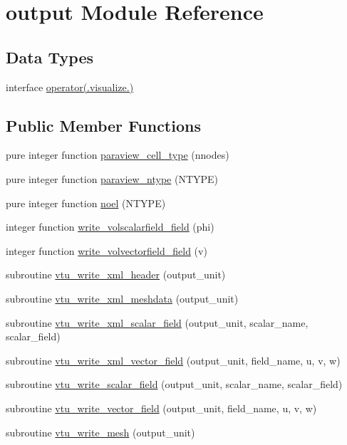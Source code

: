 \hypertarget{classoutput}{\section{output Module Reference}
\label{classoutput}
}
\subsection*{Data Types}
\begin{DoxyCompactItemize}
\item 
interface \hyperlink{interfaceoutput_1_1operator_07_8visualize_8_08}{operator(.\-visualize.)}
\end{DoxyCompactItemize}
\subsection*{Public Member Functions}
\begin{DoxyCompactItemize}
\item 
pure integer function \hyperlink{classoutput_a13f0dd663184eb8a7d5e6bedca6b1ae9}{paraview\-\_\-cell\-\_\-type} (nnodes)
\item 
pure integer function \hyperlink{classoutput_a0e9d894fc8d5b970498dbc38da4b5e8b}{paraview\-\_\-ntype} (N\-T\-Y\-P\-E)
\item 
pure integer function \hyperlink{classoutput_a7056173ffdf011c0acd43d0872ac6479}{noel} (N\-T\-Y\-P\-E)
\item 
integer function \hyperlink{classoutput_aec0a5b59f3bf4735afb3ccc21170f80d}{write\-\_\-volscalarfield\-\_\-field} (phi)
\item 
integer function \hyperlink{classoutput_a55cacab6d44b5e4d15636bd5c42bead2}{write\-\_\-volvectorfield\-\_\-field} (v)
\item 
subroutine \hyperlink{classoutput_ae0737d0d848c897c0bb7556a3a3dd866}{vtu\-\_\-write\-\_\-xml\-\_\-header} (output\-\_\-unit)
\item 
subroutine \hyperlink{classoutput_a24246576b3ee212f23b6c17c56c542ff}{vtu\-\_\-write\-\_\-xml\-\_\-meshdata} (output\-\_\-unit)
\item 
subroutine \hyperlink{classoutput_a7bb5b7be92f1202f519acc1c8b977bc1}{vtu\-\_\-write\-\_\-xml\-\_\-scalar\-\_\-field} (output\-\_\-unit, scalar\-\_\-name, scalar\-\_\-field)
\item 
subroutine \hyperlink{classoutput_af8b277fac5da59aef986ff54465695a7}{vtu\-\_\-write\-\_\-xml\-\_\-vector\-\_\-field} (output\-\_\-unit, field\-\_\-name, u, v, w)
\item 
subroutine \hyperlink{classoutput_a4f35a534b7fc56c340357b9efe60be9b}{vtu\-\_\-write\-\_\-scalar\-\_\-field} (output\-\_\-unit, scalar\-\_\-name, scalar\-\_\-field)
\item 
subroutine \hyperlink{classoutput_a6e8bb7cb030bfa7246ec346905b1eea6}{vtu\-\_\-write\-\_\-vector\-\_\-field} (output\-\_\-unit, field\-\_\-name, u, v, w)
\item 
subroutine \hyperlink{classoutput_a607012450080b564be862ec1a478a87a}{vtu\-\_\-write\-\_\-mesh} (output\-\_\-unit)
\end{DoxyCompactItemize}


